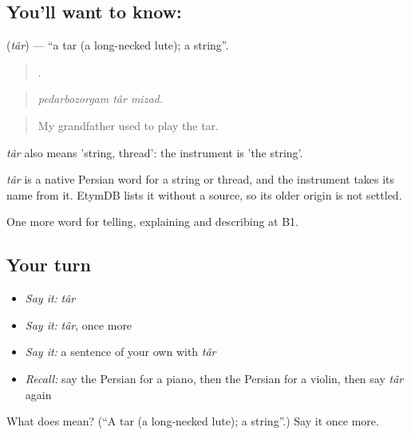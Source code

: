 \subsection*{You'll want to know: }
\textbf{} (\emph{târ}) — \textquotedblleft{}a tar (a long-necked lute); a string\textquotedblright{}.

\begin{quote}
  .
\end{quote}

\begin{quote}
\emph{pedarbozorgam târ mizad.}
\end{quote}

\begin{quote}
My grandfather used to play the tar.
\end{quote}

\emph{târ} also means 'string, thread': the instrument is 'the string'.

\begin{cousinweb}
\emph{târ} is a native Persian word for a string or thread, and the instrument takes its name from it. EtymDB lists it without a source, so its older origin is not settled.
\end{cousinweb}

\begin{grammarlens}[title={What you've built}]
One more word for telling, explaining and describing at B1.
\end{grammarlens}

\subsection*{Your turn}
\begin{itemize}
\raggedright
  \item \emph{Say it:} \emph{târ}
  \item \emph{Say it:} \emph{târ}, once more
  \item \emph{Say it:} a sentence of your own with \emph{târ}
  \item \emph{Recall:} say the Persian for a piano, then the Persian for a violin, then say \emph{târ} again
\end{itemize}

\begin{tcolorbox}[breakable,colback=teal!4,colframe=teal!35!black,title={Before you move on}]
What does  mean? (\textquotedblleft{}A tar (a long-necked lute); a string\textquotedblright{}.) Say it once more.
\end{tcolorbox}
